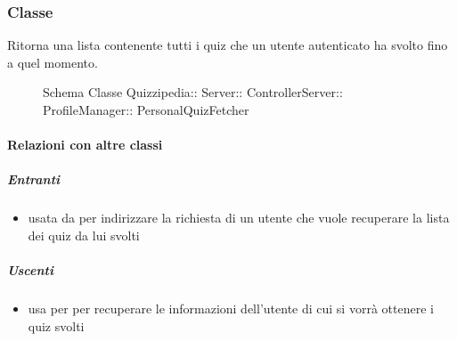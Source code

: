 \subsubsection{Classe }
Ritorna una lista contenente tutti i quiz che un utente autenticato ha svolto fino a quel momento.
\begin{figure}[H]
\centering
\noindent{}
\caption[Schema Classe PersonalQuizFetcher]{Schema Classe Quizzipedia:: Server:: ControllerServer:: ProfileManager:: PersonalQuizFetcher}
\end{figure}
\paragraph{Relazioni con altre classi}
\subparagraph{Entranti}
\begin{itemize}
\item usata da  per indirizzare la richiesta di un utente che vuole recuperare la lista dei quiz da lui svolti
\end{itemize}
\subparagraph{Uscenti}
\begin{itemize}
\item usa  per per recuperare le informazioni dell'utente di cui si vorrà ottenere i quiz svolti
\end{itemize}
